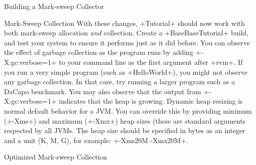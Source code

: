 \begin{chapter}{Building a Mark-sweep Collector}
\begin{section}{Mark-Sweep Collection}
With these changes, \spverb+Tutorial+ should now work with both mark-sweep allocation \textit{and} collection. Create a \spverb+BaseBaseTutorial+ build, and test your system to ensure it performs just as it did before. You can observe the effect of garbage collection as the program runs by adding \spverb+-X:gc:verbose=1+ to your command line as the first argument after \spverb+rvm+. If you run a very simple program (such as \spverb+HelloWorld+), you might not observe any garbage collection. In that case, try running a larger program such as a DaCapo benchmark. You may also observe that the output from \spverb+-X:gc:verbose=1+ indicates that the heap is growing. Dynamic heap resizing is normal default behavior for a JVM. You can override this by providing minimum (\spverb+-Xms+) and maximum (\spverb+-Xmx+) heap sizes (these are standard arguments respected by all JVMs. The heap size should be specified in bytes as an integer and a unit (K, M, G), for example: \spverb+-Xms20M -Xmx20M+.

\end{section}

\begin{section}{Optimized Mark-sweep Collection}


\end{section}
\end{chapter}
